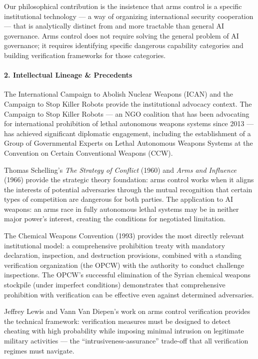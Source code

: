 Our philosophical contribution is the insistence that arms control is a
specific institutional technology --- a way of organizing international
security cooperation --- that is analytically distinct from and more
tractable than general AI governance. Arms control does not require
solving the general problem of AI governance; it requires identifying
specific dangerous capability categories and building verification
frameworks for those categories.

\paragraph{2. Intellectual Lineage \&
Precedents}\label{intellectual-lineage-precedents-25}

The International Campaign to Abolish Nuclear Weapons (ICAN) and the
Campaign to Stop Killer Robots provide the institutional advocacy
context. The Campaign to Stop Killer Robots --- an NGO coalition that
has been advocating for international prohibition of lethal autonomous
weapons systems since 2013 --- has achieved significant diplomatic
engagement, including the establishment of a Group of Governmental
Experts on Lethal Autonomous Weapons Systems at the Convention on
Certain Conventional Weapons (CCW).

Thomas Schelling's \emph{The Strategy of Conflict} (1960) and \emph{Arms
and Influence} (1966) provide the strategic theory foundation: arms
control works when it aligns the interests of potential adversaries
through the mutual recognition that certain types of competition are
dangerous for both parties. The application to AI weapons: an arms race
in fully autonomous lethal systems may be in neither major power's
interest, creating the conditions for negotiated limitation.

The Chemical Weapons Convention (1993) provides the most directly
relevant institutional model: a comprehensive prohibition treaty with
mandatory declaration, inspection, and destruction provisions, combined
with a standing verification organization (the OPCW) with the authority
to conduct challenge inspections. The OPCW's successful elimination of
the Syrian chemical weapons stockpile (under imperfect conditions)
demonstrates that comprehensive prohibition with verification can be
effective even against determined adversaries.

Jeffrey Lewis and Vann Van Diepen's work on arms control verification
provides the technical framework: verification measures must be designed
to detect cheating with high probability while imposing minimal
intrusion on legitimate military activities --- the
``intrusiveness-assurance'' trade-off that all verification regimes must
navigate.

